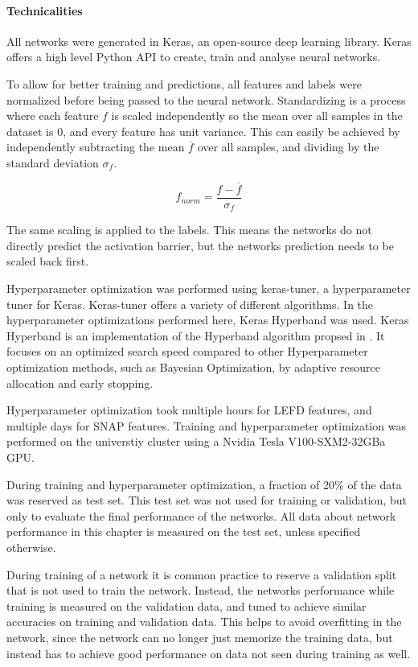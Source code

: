 \paragraph{Technicalities}

All networks were generated in Keras, an open-source deep learning library.
Keras offers a high level Python API to create, train and analyse neural networks.

To allow for better training and predictions, all features and labels were normalized before being passed to the neural network.
Standardizing is a process where each feature $f$ is scaled independently so the mean over all samples in the dataset is 0, 
and every feature has unit variance.
This can easily be achieved by independently subtracting the mean $\overline{f}$ over all samples, and dividing by the standard deviation $\sigma_f$.

$$
f_{norm} = \frac{f- \overline{f}}{\sigma_f}
$$

The same scaling is applied to the labels.
This means the networks do not directly predict the activation barrier, but the networks prediction needs to be scaled back first.

Hyperparameter optimization was performed using keras-tuner, a hyperparameter tuner for Keras.
Keras-tuner offers a variety of different algorithms.
In the hyperparameter optimizations performed here, Keras Hyperband was used.
Keras Hyperband is an  implementation of the Hyperband algorithm propsed in \cite{li2017hyperband}.
It focuses on an optimized search speed compared to other Hyperparameter optimization methods, such as
Bayesian Optimization, by adaptive resource allocation and early stopping.

Hyperparameter optimization took multiple hours for LEFD features, 
and multiple days for SNAP features.
Training and hyperparameter optimization was performed on the universtiy cluster %
using a Nvidia Tesla V100-SXM2-32GBa GPU.

During training and hyperparameter optimization, a fraction of 20\% of the data was reserved as test set.
This test set was not used for training or validation, but only to evaluate the final performance of the networks.
All data about network performance in this chapter is measured on the test set, unless specified otherwise.

During training of a network it is common practice to reserve a validation split that is not used to train the network.
Instead, the networks performance while training is measured on the validation data, and tuned to achieve similar accuracies on
training and validation data.
This helps to avoid overfitting in the network, since the network can no longer just memorize the training
data, but instead has to achieve good performance on data not seen during training as well.

